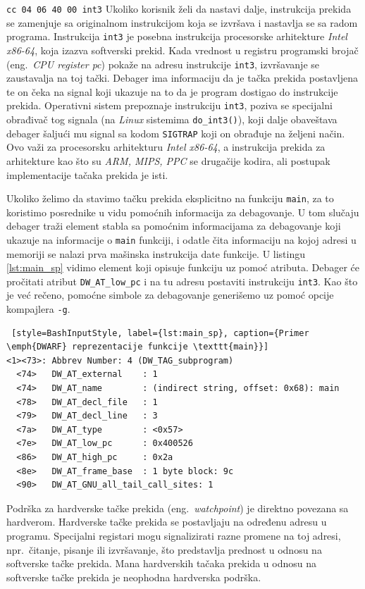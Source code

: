 \documentclass[12pt,oneside]{memoir}
\begin{document}
\texttt{cc 04 06 40 00  int3}\newline
Ukoliko korisnik želi da nastavi dalje, instrukcija prekida se zamenjuje sa originalnom instrukcijom koja se izvršava i nastavlja se sa radom programa.
Instrukcija \texttt{int3} je posebna instrukcija procesorske arhitekture \emph{Intel x86-64}, koja izazva softverski prekid. Kada vrednost u registru programski brojač (eng.~\emph{CPU register pc}) pokaže na adresu instrukcije \texttt{int3}, izvršavanje se zaustavalja na toj tački. Debager ima informaciju da je tačka prekida postavljena te on čeka na signal koji ukazuje na to da je program dostigao do instrukcije prekida. Operativni sistem prepoznaje instrukciju \texttt{int3}, poziva se specijalni obrađivač tog signala (na \emph{Linux} sistemima \texttt{do\_int3()}), koji dalje obaveštava debager šaljući mu signal sa kodom \texttt{SIGTRAP} koji on obrađuje na željeni način. Ovo važi za procesorsku arhitekturu \emph{Intel x86-64}, a instrukcija prekida za arhitekture kao što su \emph{ARM, MIPS, PPC} se drugačije kodira, ali postupak implementacije tačaka prekida je isti.

Ukoliko želimo da stavimo tačku prekida eksplicitno na funkciju \texttt{main}, za to koristimo posrednike u vidu pomoćnih informacija za debagovanje. U tom slučaju debager traži element stabla sa pomoćnim informacijama za debagovanje koji ukazuje na informacije o \texttt{main} funkciji, i odatle čita informaciju na kojoj adresi u memoriji se nalazi prva mašinska instrukcija date funkcije. U listingu \ref{lst:main_sp} vidimo element koji opisuje funkciju uz pomoć atributa. Debager će pročitati atribut \texttt{DW\_AT\_low\_pc} i na tu adresu postaviti instrukciju \texttt{int3}. Kao što je već rečeno, pomoćne simbole za debagovanje generišemo uz pomoć opcije kompajlera \texttt{-g}.
\begin{lstlisting} [style=BashInputStyle, label={lst:main_sp}, caption={Primer \emph{DWARF} reprezentacije funkcije \texttt{main}}]
<1><73>: Abbrev Number: 4 (DW_TAG_subprogram)
  <74>   DW_AT_external    : 1
  <74>   DW_AT_name        : (indirect string, offset: 0x68): main
  <78>   DW_AT_decl_file   : 1
  <79>   DW_AT_decl_line   : 3
  <7a>   DW_AT_type        : <0x57>
  <7e>   DW_AT_low_pc      : 0x400526
  <86>   DW_AT_high_pc     : 0x2a
  <8e>   DW_AT_frame_base  : 1 byte block: 9c
  <90>   DW_AT_GNU_all_tail_call_sites: 1
\end{lstlisting}

Podrška za hardverske tačke prekida (eng.~\emph{watchpoint}) je direktno povezana sa hardverom. Hardverske tačke prekida se postavljaju na određenu adresu u programu. Specijalni registari mogu signalizirati razne promene na toj adresi, npr.~čitanje, pisanje ili izvršavanje, što predstavlja prednost u odnosu na softverske tačke prekida. Mana hardverskih tačaka prekida u odnosu na softverske tačke prekida je neophodna hardverska podrška.
\end{document}
